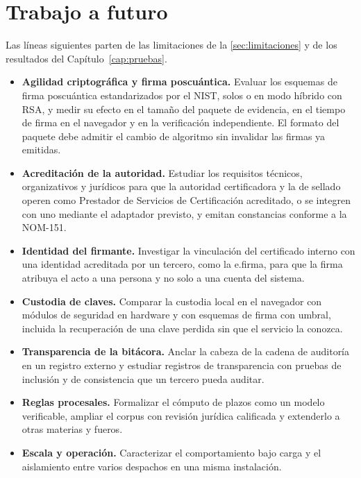 \chapter{Trabajo a futuro}\label{cap:trabajo-futuro}

Las líneas siguientes parten de las limitaciones de la
\cref{sec:limitaciones} y de los resultados del Capítulo~\ref{cap:pruebas}.

\begin{itemize}
  \item \textbf{Agilidad criptográfica y firma poscuántica.} Evaluar los
        esquemas de firma poscuántica estandarizados por el NIST, solos o en
        modo híbrido con RSA, y medir su efecto en el tamaño del paquete de
        evidencia, en el tiempo de firma en el navegador y en la verificación
        independiente. El formato del paquete debe admitir el cambio de
        algoritmo sin invalidar las firmas ya emitidas.
  \item \textbf{Acreditación de la autoridad.} Estudiar los requisitos
        técnicos, organizativos y jurídicos para que la autoridad certificadora
        y la de sellado operen como Prestador de Servicios de Certificación
        acreditado, o se integren con uno mediante el adaptador previsto, y
        emitan constancias conforme a la NOM-151.
  \item \textbf{Identidad del firmante.} Investigar la vinculación del
        certificado interno con una identidad acreditada por un tercero, como
        la e.firma, para que la firma atribuya el acto a una persona y no solo
        a una cuenta del sistema.
  \item \textbf{Custodia de claves.} Comparar la custodia local en el
        navegador con módulos de seguridad en hardware y con esquemas de firma
        con umbral, incluida la recuperación de una clave perdida sin que el
        servicio la conozca.
  \item \textbf{Transparencia de la bitácora.} Anclar la cabeza de la cadena
        de auditoría en un registro externo y estudiar registros de
        transparencia con pruebas de inclusión y de consistencia que un
        tercero pueda auditar.
  \item \textbf{Reglas procesales.} Formalizar el cómputo de plazos como un
        modelo verificable, ampliar el corpus con revisión jurídica calificada
        y extenderlo a otras materias y fueros.
  \item \textbf{Escala y operación.} Caracterizar el comportamiento bajo
        carga y el aislamiento entre varios despachos en una misma
        instalación.
\end{itemize}
